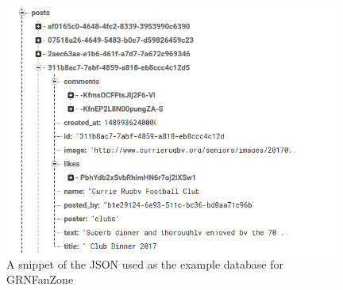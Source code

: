 \begin{figure}[H]
\begin{center}
\includegraphics[width=11cm]{figures/backend_dbexample}
\end{center}
\caption{A snippet of the JSON used as the example database for GRNFanZone}
\label{fig:backend_dbexample}
\end{figure}
